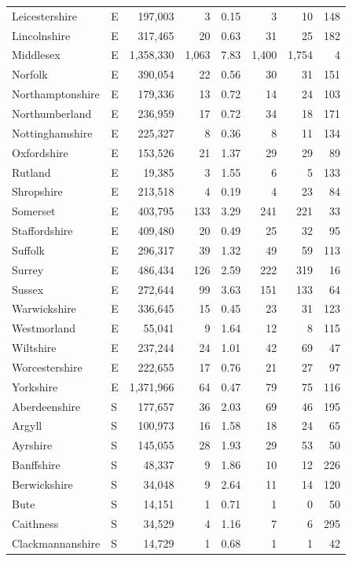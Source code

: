 \documentclass[11pt,a4paper]{article}
\begin{document}
{\begin{longtable}{llrrrrrr}
Leicestershire & E & 197,003 & 3 & 0.15 & 3 & 10 & 148\\
Lincolnshire & E & 317,465 & 20 & 0.63 & 31 & 25 & 182\\
Middlesex & E & 1,358,330 & 1,063 & 7.83 & 1,400 & 1,754 & 4\\
Norfolk & E & 390,054 & 22 & 0.56 & 30 & 31 & 151\\
Northamptonshire & E & 179,336 & 13 & 0.72 & 14 & 24 & 103\\
Northumberland & E & 236,959 & 17 & 0.72 & 34 & 18 & 171\\
Nottinghamshire & E & 225,327 & 8 & 0.36 & 8 & 11 & 134\\
Oxfordshire & E & 153,526 & 21 & 1.37 & 29 & 29 & 89\\
Rutland & E & 19,385 & 3 & 1.55 & 6 & 5 & 133\\
Shropshire & E & 213,518 & 4 & 0.19 & 4 & 23 & 84\\
Somerset & E & 403,795 & 133 & 3.29 & 241 & 221 & 33\\
Staffordshire & E & 409,480 & 20 & 0.49 & 25 & 32 & 95\\
Suffolk & E & 296,317 & 39 & 1.32 & 49 & 59 & 113\\
Surrey & E & 486,434 & 126 & 2.59 & 222 & 319 & 16\\
Sussex & E & 272,644 & 99 & 3.63 & 151 & 133 & 64\\
Warwickshire & E & 336,645 & 15 & 0.45 & 23 & 31 & 123\\
Westmorland & E & 55,041 & 9 & 1.64 & 12 & 8 & 115\\
Wiltshire & E & 237,244 & 24 & 1.01 & 42 & 69 & 47\\
Worcestershire & E & 222,655 & 17 & 0.76 & 21 & 27 & 97\\
Yorkshire & E & 1,371,966 & 64 & 0.47 & 79 & 75 & 116\\
Aberdeenshire & S & 177,657 & 36 & 2.03 & 69 & 46 & 195\\
Argyll & S & 100,973 & 16 & 1.58 & 18 & 24 & 65\\
Ayrshire & S & 145,055 & 28 & 1.93 & 29 & 53 & 50\\
Banffshire & S & 48,337 & 9 & 1.86 & 10 & 12 & 226\\
Berwickshire & S & 34,048 & 9 & 2.64 & 11 & 14 & 120\\
Bute & S & 14,151 & 1 & 0.71 & 1 & 0 & 50\\
Caithness & S & 34,529 & 4 & 1.16 & 7 & 6 & 295\\
Clackmannanshire & S & 14,729 & 1 & 0.68 & 1 & 1 & 42\\

\end{longtable}}
\end{document}
